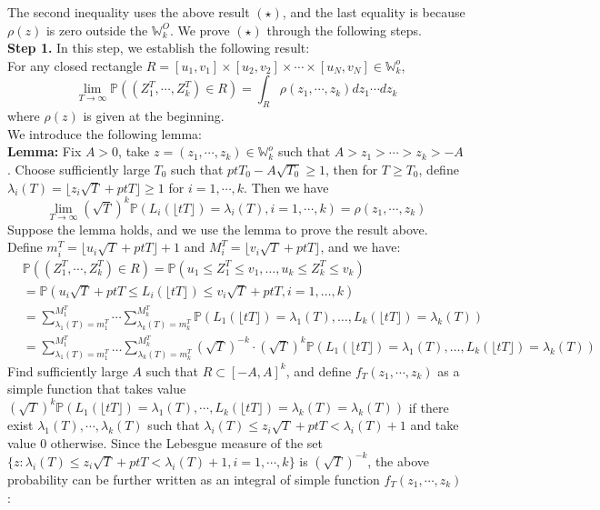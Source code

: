 \documentclass[12pt]{article}
\begin{document}
The second inequality uses the above result $(\star)$, and the last equality is because $\rho(z)$ is zero outside the $\mathbb{W}_{k}^{O}$.
We prove $(\star)$ through the following steps. \\
\textbf{Step 1. }In this step, we establish the following result:\\
For any closed rectangle $R=[u_{1},v_{1}]\times [u_{2},v_{2}]\times\cdots\times[u_{N},v_{N}]\in\mathbb{W}_{k}^{o}$, 
$$\lim_{T\rightarrow\infty}\mathbb{P}((Z_{1}^{T},\cdots,Z_{k}^{T})\in R)=\int_{R}\rho(z_{1},\cdots,z_{k})dz_{1}\cdots dz_{k}$$
where $\rho(z)$ is given at the beginning.\\
We introduce the following lemma:\\
\textbf{Lemma: }Fix $A>0$, take $z=(z_{1},\cdots,z_{k})\in\mathbb{W}_{k}^{o}$ such that $A>z_{1}>\cdots>z_{k}>-A$. Choose sufficiently large $T_{0}$ such that $ptT_{0}-A\sqrt{T_{0}}\geqslant 1$, then for $T\geqslant T_{0}$, define $\lambda_{i}(T)=\lfloor z_{i}\sqrt{T}+ptT\rfloor\geqslant 1$ for $i=1,\cdots,k$. Then we have
$$\lim_{T\rightarrow\infty}(\sqrt{T})^{k}\mathbb{P}(L_{i}(\lfloor tT\rfloor)=\lambda_{i}(T),i=1,\cdots,k)=\rho(z_{1},\cdots,z_{k})$$
Suppose the lemma holds, and we use the lemma to prove the result above. Define $m_{i}^{T}=\lfloor u_{i}\sqrt{T}+ptT\rfloor+1$ and $M_{i}^{T}=\lfloor v_{i}\sqrt{T}+ptT\rfloor$, and we have:
\begin{align*}
&\mathbb{P}((Z_{1}^{T},\cdots,Z_{k}^{T})\in R)=\mathbb{P}(u_{1}\leqslant Z_{1}^{T} \leqslant v_{1}, \dots,  u_{k}\leqslant Z_{k}^{T} \leqslant v_{k})\\
&=\mathbb{P}(u_{i}\sqrt{T}+ptT\leqslant L_{i}(\lfloor tT\rfloor) \leqslant v_{i}\sqrt{T}+ptT, i=1,\dots, k)\\
&=\sum_{\lambda_{1}(T)=m_{1}^{T}}^{M_{1}^{T}}\cdots\sum_{\lambda_{k}(T)=m_{k}^{T}}^{M_{k}^{T}}\mathbb{P}(L_{1}(\lfloor tT \rfloor)=\lambda_{1}(T),\dots,L_{k}(\lfloor tT \rfloor)=\lambda_{k}(T))\\
&=\sum_{\lambda_{1}(T)=m_{1}^{T}}^{M_{1}^{T}}\dots\sum_{\lambda_{k}(T)=m_{k}^{T}}^{M_{k}^{T}}(\sqrt{T})^{-k}\cdot(\sqrt{T})^{k}\mathbb{P}(L_{1}(\lfloor tT \rfloor)=\lambda_{1}(T),\dots,L_{k}(\lfloor tT \rfloor)=\lambda_{k}(T))
\end{align*}
Find sufficiently large $A$ such that $R\subset[-A,A]^{k}$, and define $f_{T}(z_{1},\cdots,z_{k})$ as a simple function that takes value $(\sqrt{T})^{k}\mathbb{P}(L_{1}(\lfloor tT \rfloor)=\lambda_{1}(T),\cdots,L_{k}(\lfloor tT \rfloor)=\lambda_{k}(T)=\lambda_{k}(T))$ if there exist $\lambda_{1}(T),\cdots,\lambda_{k}(T)$ such that $\lambda_{i}(T)\leqslant z_{i}\sqrt{T}+ptT<\lambda_{i}(T)+1$ and take value $0$ otherwise. Since the Lebesgue measure of the set $\{z:\lambda_{i}(T)\leqslant z_{i}\sqrt{T}+ptT<\lambda_{i}(T)+1,i=1,\cdots,k\}$ is $(\sqrt{T})^{-k}$, the above probability can be further written as an integral of simple function $f_{T}(z_{1},\cdots,z_{k})$:
\end{document}
